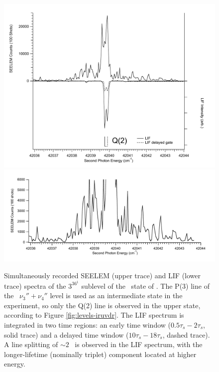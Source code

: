 \begin{figure}
  \caption{Simultaneously recorded SEELEM (upper trace) and LIF (lower
    trace) spectra of the $3^36^1$  sublevel of the \astate\
    state of .  The P(3) line of the \xstate\ $\nu_3'' +
    \nu_4''$ level is used as an intermediate state in the experiment,
    so only the Q(2) line is observed in the upper state, according to
    Figure \ref{fig:levels-iruvdr}.  The LIF spectrum is integrated in
    two time regions: an early time window ($0.5\tau_s-2\tau_s$, solid
    trace) and a delayed time window ($10\tau_s-18\tau_s$, dashed
    trace).  A line splitting of $\sim 2$ \rcm\ is observed in the LIF
    spectrum, with the longer-lifetime (nominally triplet) component
    located at higher energy.}
  \label{fig:3361-q2}
  \centering
  \includegraphics[width=6in]{spectrum-3361-q2-split.pdf}
  \includegraphics[width=6in]{spectrum-3361-q2-zoom.pdf}
\end{figure}

